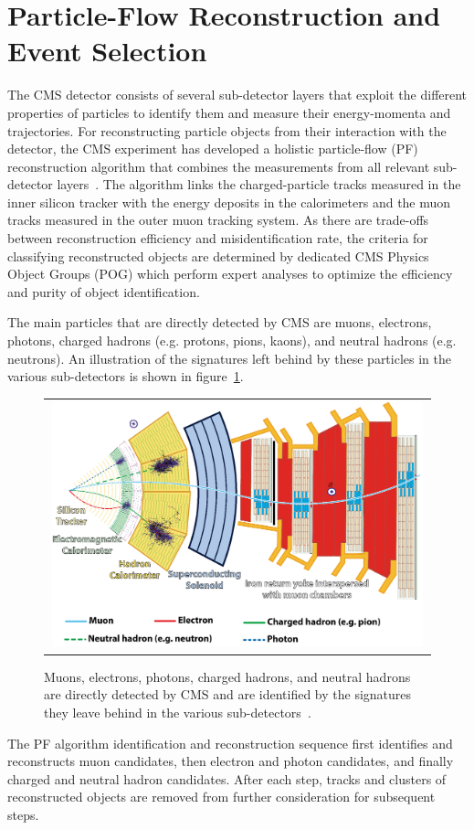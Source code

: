 \section{Particle-Flow Reconstruction and Event Selection}
The CMS detector consists of several sub-detector layers that exploit the different properties of particles to identify them and measure their energy-momenta and trajectories.
For reconstructing particle objects from their interaction with the detector, the CMS experiment has developed a holistic particle-flow (PF) reconstruction algorithm that combines the measurements from all relevant sub-detector layers~\cite{Sirunyan:2270046}.
The algorithm links the charged-particle tracks measured in the inner silicon tracker with the energy deposits in the calorimeters and the muon tracks measured in the outer muon tracking system.
As there are trade-offs between reconstruction efficiency and misidentification rate, the criteria for classifying reconstructed objects are determined by dedicated CMS Physics Object Groups (POG) which perform expert analyses to optimize the efficiency and purity of object identification.

The main particles that are directly detected by CMS are muons, electrons, photons, charged hadrons (e.g. protons, pions, kaons), and neutral hadrons (e.g. neutrons).
An illustration of the signatures left behind by these particles in the various sub-detectors is shown in figure~\ref{CMS_Layers}.
\begin{figure}[htb]
  \begin{center}
    \begin{tabular}{c}
        \includegraphics[width=0.99\textwidth]{fig_LHC_CMS/CMS_Layers.png}
    \end{tabular}
    \caption{Muons, electrons, photons, charged hadrons, and neutral hadrons are directly detected by CMS and are identified by the signatures they leave behind in the various sub-detectors~\cite{Sirunyan:2270046}.
            }
    \label{CMS_Layers}
  \end{center}
\end{figure}
The PF algorithm identification and reconstruction sequence first identifies and reconstructs muon candidates, then electron and photon candidates, and finally charged and neutral hadron candidates.
After each step, tracks and clusters of reconstructed objects are removed from further consideration for subsequent steps.

